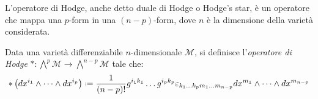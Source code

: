 L'operatore di Hodge, anche detto duale di Hodge o Hodge's star, è un operatore che mappa una $ p $-form in una $ (n - p) $-form, dove $ n $ è la dimensione della varietà considerata.
\begin{definition}
	Data una varietà differenziabile $ n $-dimensionale $ \mathcal{M} $, si definisce l'\textit{operatore di Hodge} $ * : \bigwedge^p \mathcal{M} \rightarrow \bigwedge^{n - p} \mathcal{M} $ tale che:
	\begin{equation}
		* \left( dx^{i_1} \wedge \dots \wedge dx^{i_p} \right) \defeq \frac{1}{(n - p)!} g^{i_1 k_1} \dots g^{i_p k_p} \varepsilon_{k_1 \dots k_p m_1 \dots m_{n - p}} dx^{m_1} \wedge \dots \wedge dx^{m_{n - p}}
		\label{eq:3.18}
	\end{equation}
\end{definition}

